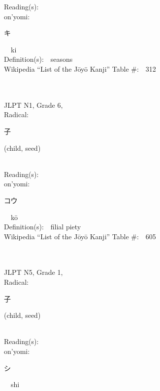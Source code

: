 \begin{multicols}{2}
Reading(s):\ \ \\
{\hspace*{1em}}on'yomi:\ \ \\
{\hspace*{2em}}{\begin{CJK}{UTF8}{min} キ \end{CJK}}\ \ ki\ \ \\
Definition(s):\ \ seasons \\
Wikipedia ``List of the J\=oy\=o Kanji'' Table \#:\ \ 312 \\
\ \ \\
{\fontsize{34pt}{40pt}  }\ \ \\  %
{JLPT N1, Grade 6, \\Radical:\ \ {\begin{CJK}{UTF8}{min} 子 \end{CJK}} (child, seed) } \\
Reading(s):\ \ \\
{\hspace*{1em}}on'yomi:\ \ \\
{\hspace*{2em}}{\begin{CJK}{UTF8}{min} コウ \end{CJK}}\ \ k\=o\ \ \\
Definition(s):\ \ filial piety \\
Wikipedia ``List of the J\=oy\=o Kanji'' Table \#:\ \ 605 \\
\ \ \\
{\fontsize{34pt}{40pt}  }\ \ \\  %
{JLPT N5, Grade 1, \\Radical:\ \ {\begin{CJK}{UTF8}{min} 子 \end{CJK}} (child, seed) } \\
Reading(s):\ \ \\
{\hspace*{1em}}on'yomi:\ \ \\
{\hspace*{2em}}{\begin{CJK}{UTF8}{min} シ \end{CJK}}\ \ shi\ \ \\

\end{multicols}
